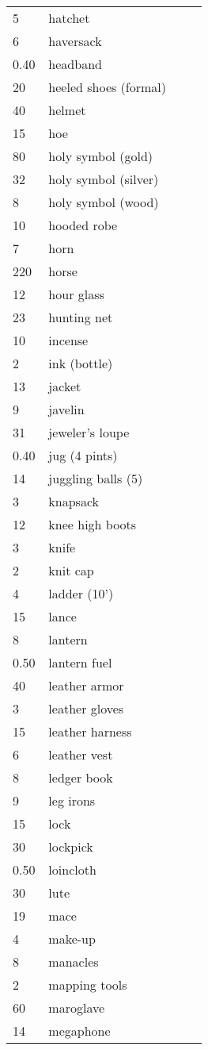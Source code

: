 \documentclass{article}
\begin{document}
\begin{longtable}{@{}p{0.18\linewidth} p{0.8\linewidth}}
5 & hatchet\\
6 & haversack\\
0.40 & headband\\
20 & heeled shoes (formal)\\
40 & helmet\\
15 & hoe\\
80 & holy symbol (gold)\\
32 & holy symbol (silver)\\
8 & holy symbol (wood)\\
10 & hooded robe\\
7 & horn\\
220 & horse\\
12 & hour glass\\
23 & hunting net\\
10 & incense\\
2 & ink (bottle)\\
13 & jacket\\
9 & javelin\\
31 & jeweler's loupe\\
0.40 & jug (4 pints)\\
14 & juggling balls (5)\\
3 & knapsack\\
12 & knee high boots\\
3 & knife\\
2 & knit cap\\
4 & ladder (10')\\
15 & lance\\
8 & lantern\\
0.50 & lantern fuel\\
40 & leather armor\\
3 & leather gloves\\
15 & leather harness\\
6 & leather vest\\
8 & ledger book\\
9 & leg irons\\
15 & lock\\
30 & lockpick\\
0.50 & loincloth\\
30 & lute\\
19 & mace\\
4 & make-up\\
8 & manacles\\
2 & mapping tools\\
60 & maroglave\\
14 & megaphone\\

\end{longtable}
\end{document}
